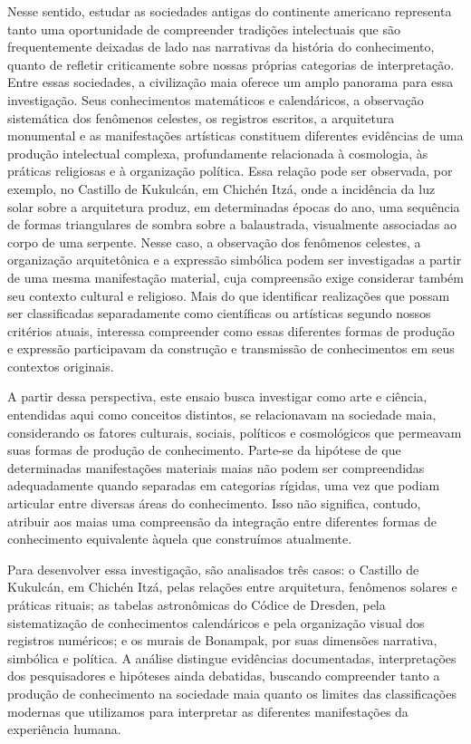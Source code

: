 \documentclass[11pt, a4paper]{article}
\begin{document}
Nesse sentido, estudar as sociedades antigas do continente americano representa tanto uma oportunidade de compreender tradições intelectuais que são frequentemente deixadas de lado nas narrativas da história do conhecimento, quanto de refletir criticamente sobre nossas próprias categorias de interpretação. Entre essas sociedades, a civilização maia oferece um amplo panorama para essa investigação. Seus conhecimentos matemáticos e calendáricos, a observação sistemática dos fenômenos celestes, os registros escritos, a arquitetura monumental e as manifestações artísticas constituem diferentes evidências de uma produção intelectual complexa, profundamente relacionada à cosmologia, às práticas religiosas e à organização política. Essa relação pode ser observada, por exemplo, no Castillo de Kukulcán, em Chichén Itzá, onde a incidência da luz solar sobre a arquitetura produz, em determinadas épocas do ano, uma sequência de formas triangulares de sombra sobre a balaustrada, visualmente associadas ao corpo de uma serpente. Nesse caso, a observação dos fenômenos celestes, a organização arquitetônica e a expressão simbólica podem ser investigadas a partir de uma mesma manifestação material, cuja compreensão exige considerar também seu contexto cultural e religioso. Mais do que identificar realizações que possam ser classificadas separadamente como científicas ou artísticas segundo nossos critérios atuais, interessa compreender como essas diferentes formas de produção e expressão participavam da construção e transmissão de conhecimentos em seus contextos originais. 

A partir dessa perspectiva, este ensaio busca investigar como arte e ciência, entendidas aqui como conceitos distintos, se relacionavam na sociedade maia, considerando os fatores culturais, sociais, políticos e cosmológicos que permeavam suas formas de produção de conhecimento. Parte-se da hipótese de que determinadas manifestações materiais maias não podem ser compreendidas adequadamente quando separadas em categorias rígidas, uma vez que podiam articular entre diversas áreas do conhecimento. Isso não significa, contudo, atribuir aos maias uma compreensão da integração entre diferentes formas de conhecimento equivalente àquela que construímos atualmente.

Para desenvolver essa investigação, são analisados três casos: o Castillo de Kukulcán, em Chichén Itzá, pelas relações entre arquitetura, fenômenos solares e práticas rituais; as tabelas astronômicas do Códice de Dresden, pela sistematização de conhecimentos calendáricos e pela organização visual dos registros numéricos; e os murais de Bonampak, por suas dimensões narrativa, simbólica e política. A análise distingue evidências documentadas, interpretações dos pesquisadores e hipóteses ainda debatidas, buscando compreender tanto a produção de conhecimento na sociedade maia quanto os limites das classificações modernas que utilizamos para interpretar as diferentes manifestações da experiência humana.
\end{document}
